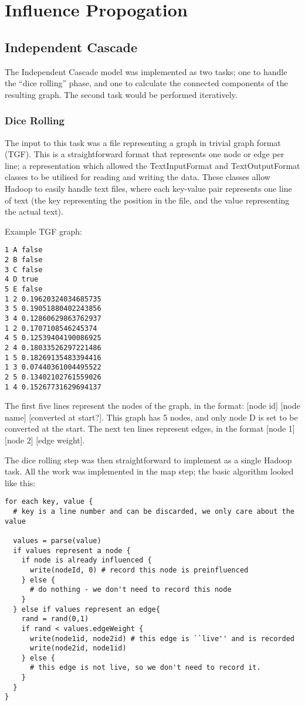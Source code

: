 \section{Influence Propogation}

\subsection{Independent Cascade}

The Independent Cascade model was implemented as two tasks; one to handle the ``dice rolling'' phase, and one to calculate the connected components of the resulting graph. The second task would be performed iteratively.

\subsubsection{Dice Rolling}

The input to this task was a file representing a graph in trivial graph format (TGF). This is a straightforward format that represents one node or edge per line; a representation which allowed the TextInputFormat and TextOutputFormat classes to be utilised for reading and writing the data. These classes allow Hadoop to easily handle text files, where each key-value pair represents one line of text (the key representing the position in the file, and the value representing the actual text).

Example TGF graph:

\begin{verbatim}
1 A false
2 B false
3 C false
4 D true
5 E false
1 2 0.19620324034685735
3 5 0.19051880402243856
3 4 0.12860629863762937
1 2 0.1707108546245374
4 5 0.12539404190086925
2 4 0.18033526297221486
1 5 0.18269135483394416
1 3 0.07440361004495522
2 5 0.13402102761559026
1 4 0.15267731629694137
\end{verbatim}

The first five lines represent the nodes of the graph, in the format: [node id] [node name] [converted at start?]. This graph has 5 nodes, and only node D is set to be converted at the start. The next ten lines represent edges, in the format [node 1] [node 2] [edge weight].

The dice rolling step was then straightforward to implement as a single Hadoop task. All the work was implemented in the map step; the basic algorithm looked like this:

\begin{verbatim}
for each key, value {
  # key is a line number and can be discarded, we only care about the value

  values = parse(value)
  if values represent a node {
    if node is already influenced {
      write(nodeId, 0) # record this node is preinfluenced
    } else {
      # do nothing - we don't need to record this node
    }
  } else if values represent an edge{
    rand = rand(0,1)
    if rand < values.edgeWeight {
      write(node1id, node2id) # this edge is ``live'' and is recorded
      write(node2id, node1id)
    } else {
      # this edge is not live, so we don't need to record it.
    }
  }
}
\end{verbatim}

